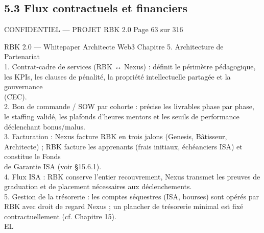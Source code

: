 \subsection{5.3 Flux contractuels et financiers}
\vspace{0.5em}
\vspace{0.5em}
\vspace{0.5em}
\begin{confidential}CONFIDENTIEL — PROJET RBK 2.0                                               Page 63 sur 316\end{confidential}
RBK 2.0 — Whitepaper Architecte Web3                                                                                       Chapitre 5. Architecture de Partenariat\\
\vspace{0.5em}
\vspace{0.5em}
\vspace{0.5em}
1. Contrat-cadre de services (RBK ↔ Nexus) : définit le périmètre pédagogique, les KPIs, les clauses de pénalité, la propriété intellectuelle partagée et la gouvernance\\
(CEC).\\
2. Bon de commande / SOW par cohorte : précise les livrables phase par phase, le staffing validé, les plafonds d’heures mentors et les seuils de performance\\
déclenchant bonus/malus.\\
3. Facturation : Nexus facture RBK en trois jalons (Genesis, Bâtisseur, Architecte) ; RBK facture les apprenants (frais initiaux, échéanciers ISA) et constitue le Fonds\\
de Garantie ISA (voir §15.6.1).\\
4. Flux ISA : RBK conserve l’entier recouvrement, Nexus transmet les preuves de graduation et de placement nécessaires aux déclenchements.\\
5. Gestion de la trésorerie : les comptes séquestres (ISA, bourses) sont opérés par RBK avec droit de regard Nexus ; un plancher de trésorerie minimal est fixé\\
contractuellement (cf. Chapitre 15).\\
\vspace{0.5em}
\vspace{0.5em}
\vspace{0.5em}
\vspace{0.5em}
EL\\
